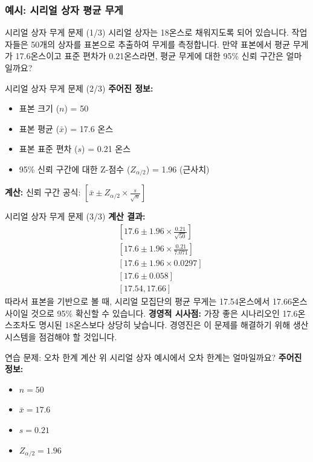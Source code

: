 \documentclass[11pt,a4paper]{article}
\begin{document}
\subsubsection*{예시: 시리얼 상자 평균 무게}

\begin{examplebox}{시리얼 상자 무게 문제 (1/3)}
시리얼 상자는 18온스로 채워지도록 되어 있습니다.
작업자들은 50개의 상자를 표본으로 추출하여 무게를 측정합니다.
만약 표본에서 평균 무게가 17.6온스이고 표준 편차가 0.21온스라면, 평균 무게에 대한 95\% 신뢰 구간은 얼마일까요?
\end{examplebox}

\begin{examplebox}{시리얼 상자 무게 문제 (2/3)}
\textbf{주어진 정보:}
\begin{itemize}
    \item 표본 크기 ($n$) = 50
    \item 표본 평균 ($\bar{x}$) = 17.6 온스
    \item 표본 표준 편차 ($s$) = 0.21 온스
    \item 95\% 신뢰 구간에 대한 Z-점수 ($Z_{\alpha/2}$) = 1.96 (근사치)
\end{itemize}
\textbf{계산:}
신뢰 구간 공식: $[\bar{x} \pm Z_{\alpha/2} \times \frac{s}{\sqrt{n}}]$
\end{examplebox}

\begin{examplebox}{시리얼 상자 무게 문제 (3/3)}
\textbf{계산 결과:}
\begin{align*}
    & [17.6 \pm 1.96 \times \frac{0.21}{\sqrt{50}}] \\
    & [17.6 \pm 1.96 \times \frac{0.21}{7.071}] \\
    & [17.6 \pm 1.96 \times 0.0297] \\
    & [17.6 \pm 0.058] \\
    & [17.54, 17.66]
\end{align*}
따라서 표본을 기반으로 볼 때, 시리얼 모집단의 평균 무게는 17.54온스에서 17.66온스 사이일 것으로 95\% 확신할 수 있습니다.
\textbf{경영적 시사점:} 가장 좋은 시나리오인 17.6온스조차도 명시된 18온스보다 상당히 낮습니다. 경영진은 이 문제를 해결하기 위해 생산 시스템을 점검해야 할 것입니다.
\end{examplebox}

\begin{examplebox}{연습 문제: 오차 한계 계산}
위 시리얼 상자 예시에서 오차 한계는 얼마일까요?
\textbf{주어진 정보:}
\begin{itemize}
    \item $n = 50$
    \item $\bar{x} = 17.6$
    \item $s = 0.21$
    \item $Z_{\alpha/2} = 1.96$
\end{itemize}
\end{examplebox}
\end{document}
